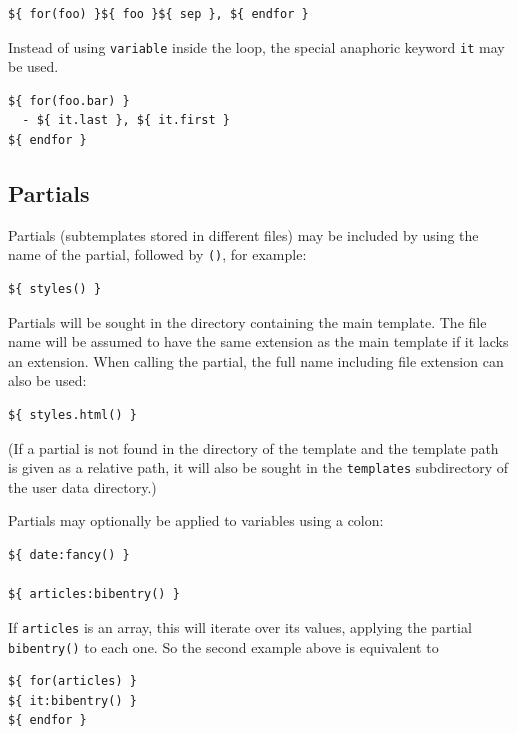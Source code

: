 \documentclass[
  b5paper
]{book}
\begin{document}
\begin{verbatim}
${ for(foo) }${ foo }${ sep }, ${ endfor }
\end{verbatim}

Instead of using \texttt{variable} inside the loop, the special
anaphoric keyword \texttt{it} may be used.

\begin{verbatim}
${ for(foo.bar) }
  - ${ it.last }, ${ it.first }
${ endfor }
\end{verbatim}

\subsection{Partials}\label{partials}

Partials (subtemplates stored in different files) may be included by
using the name of the partial, followed by \texttt{()}, for example:

\begin{verbatim}
${ styles() }
\end{verbatim}

Partials will be sought in the directory containing the main template.
The file name will be assumed to have the same extension as the main
template if it lacks an extension. When calling the partial, the full
name including file extension can also be used:

\begin{verbatim}
${ styles.html() }
\end{verbatim}

(If a partial is not found in the directory of the template and the
template path is given as a relative path, it will also be sought in the
\texttt{templates} subdirectory of the user data directory.)

Partials may optionally be applied to variables using a colon:

\begin{verbatim}
${ date:fancy() }

${ articles:bibentry() }
\end{verbatim}

If \texttt{articles} is an array, this will iterate over its values,
applying the partial \texttt{bibentry()} to each one. So the second
example above is equivalent to

\begin{verbatim}
${ for(articles) }
${ it:bibentry() }
${ endfor }
\end{verbatim}
\end{document}
